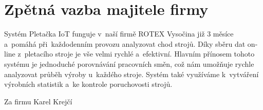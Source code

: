 \chapter{Zpětná vazba majitele firmy}
Systém Pletačka IoT funguje v~naší firmě ROTEX Vysočina již 3 měsíce a~pomáhá při~každodenním provozu analyzovat chod strojů.
Díky sběru dat on-line z~pletacího stroje je vše velmi rychlé a~efektivní.
Hlavním přínosem tohoto systému je jednoduché porovnávání pracovních směn, což nám umožňuje rychle analyzovat průběh výroby u~každého stroje.
Systém také využíváme k~vytváření výrobních statistik a~ke kontrole poruchovosti strojů.

{\raggedleft Za firmu Karel Krejčí\par}



\newpage